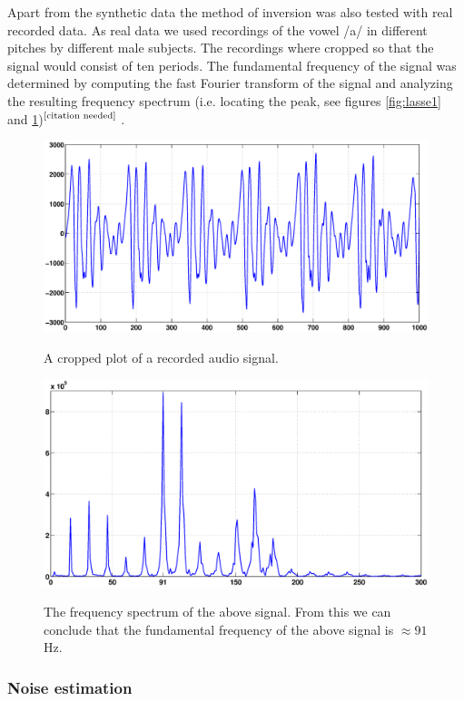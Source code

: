 \documentclass[12pt,a4]{article}
\newcommand{\citeneeded}{\ensuremath{\vphantom{1}^{\text{[citation needed]}}\,}}
\begin{document}
Apart from the synthetic data the method of inversion was also tested with real recorded data. As real data we used recordings of the vowel /a/ in different pitches by different male subjects. The recordings where cropped so that the signal would consist of ten periods. The fundamental frequency of the signal was determined by computing the fast Fourier transform of the signal and analyzing the resulting frequency spectrum (i.e. locating the peak, see figures \ref{fig:lasse1} and \ref{fig:lasse2})\citeneeded.
\begin{figure}[H]
\begin{center}
 \includegraphics[scale=.3]{img/lasse_signal.eps}
 \caption{A cropped plot of a recorded audio signal.}\label{fig:lasse1}
 \includegraphics[scale=.3]{img/lasse_spectrum.eps}
 \caption{The frequency spectrum of the above signal. From this we can conclude that the fundamental frequency of the above signal is $\approx 91$ Hz.}\label{fig:lasse2}
\end{center}
\end{figure}

\subsubsection{Noise estimation}
\label{sec:noiseEst}
\end{document}
